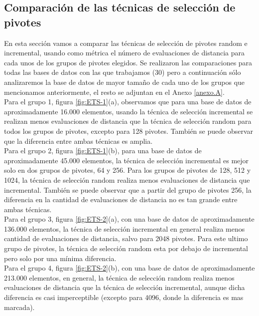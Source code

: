 \subsection{Comparaci\'on de las t\'ecnicas de selecci\'on de pivotes}

En esta secci\'on vamos a comparar las t\'ecnicas de selecci\'on de pivotes random e incremental, usando como m\'etrica el n\'umero de evaluaciones de distancia para cada unos de los grupos de pivotes elegidos. Se realizaron las comparaciones para todas las bases de datos con las que trabajamos (30) pero a continuaci\'on s\'olo analizaremos la base de datos de mayor tama\~no de cada uno de los grupos que mencionamos anteriormente, el resto se adjuntan en el Anexo \ref{anexo.A}.\\

Para el grupo 1, figura \ref{fig:ETS-1}(a), observamos que para una base de datos de aproximadamente 16.000 elementos,  usando la t\'ecnica de selecci\'on incremental se realizan menos evaluaciones de distancia que la t\'ecnica de selecci\'on random para todos los grupos de pivotes, excepto para 128 pivotes. Tambi\'en se puede observar que la diferencia entre ambas t\'ecnicas es amplia.\\

Para el grupo 2, figura \ref{fig:ETS-1}(b), para una base de datos de aproximadamente 45.000 elementos, la t\'ecnica de selecci\'on incremental es mejor solo en dos grupos de pivotes, 64 y 256. Para los grupos de pivotes de 128, 512 y 1024, la t\'ecnica de selecci\'on random realiza menos evaluaciones de distancia que incremental. Tambi\'en se puede observar que a partir del grupo de pivotes 256, la diferencia en la cantidad de evaluaciones de distancia no es tan grande entre ambas t\'ecnicas.\\

Para el grupo 3, figura \ref{fig:ETS-2}(a), con una base de datos de aproximadamente 136.000 elementos, la t\'ecnica de selecci\'on incremental en general realiza menos cantidad de evaluaciones de distancia, salvo para 2048 pivotes. Para este ultimo grupo de pivotes, la t\'ecnica de selecci\'on random esta por debajo de incremental pero solo por una m\'inima diferencia.\\

Para el grupo 4, figura \ref{fig:ETS-2}(b), con una base de datos de aproximadamente 213.000 elementos, en general, la t\'ecnica de selecci\'on random realiza menos  evaluaciones de distancia que la t\'ecnica de selecci\'on incremental, aunque dicha diferencia es casi imperceptible (excepto para 4096, donde la diferencia es mas marcada).\\


